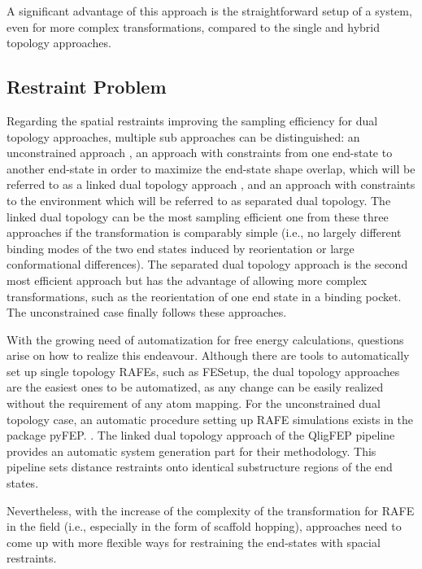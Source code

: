 A significant advantage of this approach is the straightforward setup of a system, even for more complex transformations, compared to the single and hybrid topology approaches. 

\subsection{Restraint Problem}
Regarding the spatial restraints improving the sampling efficiency for dual topology approaches, multiple sub approaches can be distinguished:
an unconstrained approach \cite{Henin2004, Carvalho2021}, an approach with constraints from one end-state to another end-state in order to maximize the end-state shape overlap, which will be referred to as a linked dual topology approach \cite{Riniker2011, Sidler2016}, and an approach with constraints to the environment which will be referred to as separated dual topology. \cite{Mobley2006, Rocklin2013}
The linked dual topology can be the most sampling efficient one from these three approaches if the transformation is comparably simple (i.e., no largely different binding modes of the two end states induced by reorientation or large conformational differences). The separated dual topology approach is the second most efficient approach but has the advantage of allowing more complex transformations, such as the reorientation of one end state in a binding pocket. The unconstrained case finally follows these approaches. \cite{Mobley2006}

With the growing need of automatization for free energy calculations, questions arise on how to realize this endeavour. Although there are tools to automatically set up single topology RAFEs, such as FESetup\cite{Loeffler2015}, the dual topology approaches are the easiest ones to be automatized, as any change can be easily realized without the requirement of any atom mapping. \cite{Rocklin2013}
For the unconstrained dual topology case, an automatic procedure setting up RAFE simulations exists in the package pyFEP. \cite{Carvalho2021}. The linked dual topology approach of the QligFEP pipeline provides an automatic system generation part for their methodology. This pipeline sets distance restraints onto identical substructure regions of the end states. \cite{Jespers2019}

Nevertheless, with the increase of the complexity of the transformation for RAFE in the field (i.e., especially in the form of scaffold hopping), approaches need to come up with more flexible ways for restraining the end-states with spacial restraints.

